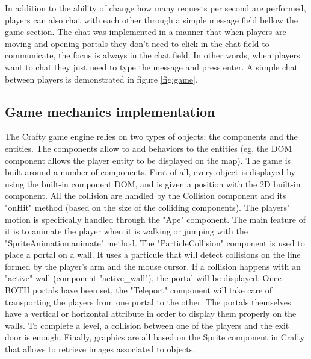 \documentclass{chi-ext}
\begin{document}
In addition to the ability of change how many requests per second are performed, players can also chat with each other through a simple message field bellow the game section. The chat was implemented in a manner that when players are moving and opening portals they don't need to click in the chat field to communicate, the focus is always in the chat field. In other words, when players want to chat they just need to type the message and press enter. A simple chat between players is demonstrated in figure \ref{fig:game}.

\subsection{Game mechanics implementation}
The Crafty game engine relies on two types of objects: the components and the entities. The components allow to add behaviors to the entities (eg, the DOM component allows the player entity to be displayed on the map).
\newline
\newline
The game is built around a number of components.
\newline
First of all, every object is displayed by using the built-in component DOM, and is given a position with the 2D built-in component. All the collision are handled by the Collision component and its "onHit" method (based on the size of the colliding components).
\newline
The players' motion is specifically handled through the "Ape" component. The main feature of it is to animate the player when it is walking or jumping with the "SpriteAnimation.animate" method.
\newline
The "ParticleCollision" component is used to place a portal on a wall. It uses a particule that will detect collisions on the line formed by the player's arm and the mouse cursor. If a collision happens with an "active" wall (component "active_wall"), the portal will be displayed. Once BOTH portals have been set, the "Teleport" component will take care of transporting the players from one portal to the other. The portals themselves have a vertical or horizontal attribute in order to display them properly on the walls.
\newline
To complete a level, a collision between one of the players and the exit door is enough.
\newline
Finally, graphics are all based on the Sprite component in Crafty that allows to retrieve images associated to objects.
\newline
\end{document}
